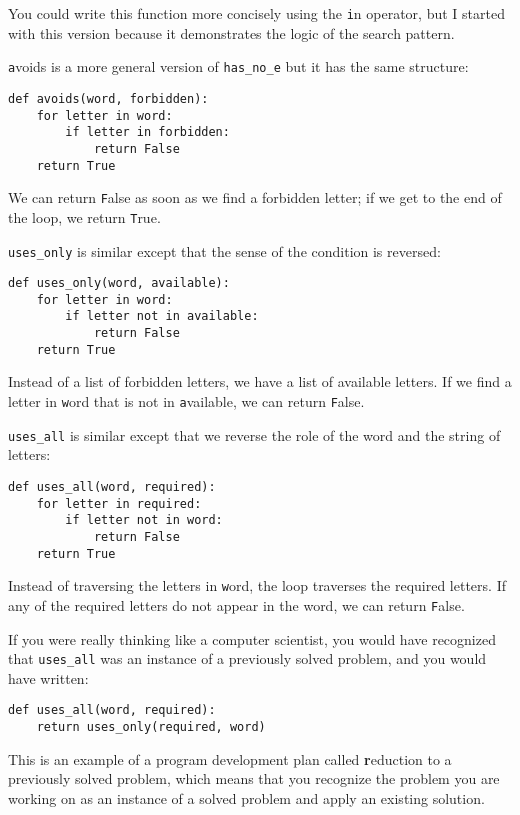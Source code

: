 \documentclass[
DIV=11,
fontsize=13,
twoside,
headinclude=false,
titlepage=firstiscover,
abstract=true,
headsepline=true,
footsepline=true,
chapterprefix=true, %
headings=big,
bibliography=totoc,%
captions=tableheading
]{scrbook}
\theoremstyle{definition}
\begin{document}
You could write this function more concisely using the {\texttt in}
operator, but I started with this version because it 
demonstrates the logic of the search pattern.

{\texttt avoids} is a more general version of \verb"has_no_e" but it
has the same structure:

\begin{lstlisting}
def avoids(word, forbidden):
    for letter in word:
        if letter in forbidden:
            return False
    return True
\end{lstlisting}
%
We can return {\texttt False} as soon as we find a forbidden letter;
if we get to the end of the loop, we return {\texttt True}.

\verb"uses_only" is similar except that the sense of the condition
is reversed:

\begin{lstlisting}
def uses_only(word, available):
    for letter in word: 
        if letter not in available:
            return False
    return True
\end{lstlisting}
%
Instead of a list of forbidden letters, we have a list of available
letters.  If we find a letter in {\texttt word} that is not in
{\texttt available}, we can return {\texttt False}.

\verb"uses_all" is similar except that we reverse the role
of the word and the string of letters:

\begin{lstlisting}
def uses_all(word, required):
    for letter in required: 
        if letter not in word:
            return False
    return True
\end{lstlisting}
%
Instead of traversing the letters in {\texttt word}, the loop
traverses the required letters.  If any of the required letters
do not appear in the word, we can return {\texttt False}.

If you were really thinking like a computer scientist, you would
have recognized that \verb"uses_all" was an instance of a
previously solved problem, and you would have written:

\begin{lstlisting}
def uses_all(word, required):
    return uses_only(required, word)
\end{lstlisting}
%
This is an example of a program development plan called {\textbf
  reduction to a previously solved problem}, which means that you
recognize the problem you are working on as an instance of a solved
problem and apply an existing solution.   
\end{document}
